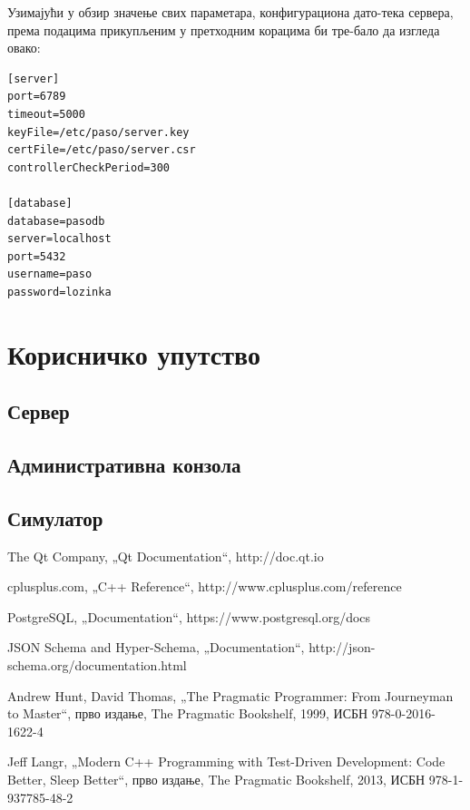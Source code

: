 \documentclass[a4paper, 12pt, diplomski]{etfcyr}
\def\quote#1{„#1“}
\begin{document}
\begin{justify}
							Узимајући у обзир значење свих параметара, конфигурациона дато-тека сервера, према подацима прикупљеним у претходним корацима би тре-бало да изгледа овако:
							\begin{lstlisting}[caption=Датотека за подешавање сервера]
[server]
port=6789
timeout=5000
keyFile=/etc/paso/server.key
certFile=/etc/paso/server.csr
controllerCheckPeriod=300

[database]
database=pasodb
server=localhost
port=5432
username=paso
password=lozinka
							\end{lstlisting}

						\end{justify}


	\chapter{Корисничко упутство}

		\section{Сервер}

		\section{Административна конзола}

		\section{Симулатор}


	\begin{thebibliography}{9}
		The Qt Company, \quote{Qt Documentation},
		http://doc.qt.io

		cplusplus.com, \quote{C++ Reference},
		http://www.cplusplus.com/reference

		PostgreSQL, \quote{Documentation},
		https://www.postgresql.org/docs

		JSON Schema and Hyper-Schema, \quote{Documentation},
		http://json-schema.org/documentation.html

		Andrew Hunt, David Thomas, \quote{The Pragmatic Programmer: From Journeyman to Master},
		прво издање, The Pragmatic Bookshelf, 1999, ИСБН 978-0-2016-1622-4
		
		Jeff Langr, \quote{Modern C++ Programming with Test-Driven Development: Code Better, Sleep Better},
		прво издање, The Pragmatic Bookshelf, 2013, ИСБН 978-1-937785-48-2
	\end{thebibliography}
\end{document}
